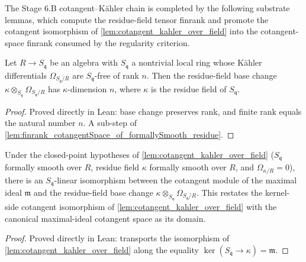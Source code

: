 The Stage 6.B cotangent--K\"ahler chain is completed by the
following substrate lemmas, which compute the residue-field tensor finrank and
promote the cotangent isomorphism of \cref{lem:cotangent_kahler_over_field} into
the cotangent-space finrank consumed by the regularity criterion.

\begin{lemma}
  \label{lem:finrank_residue_kaehler_of_free_rank}
  Let \(R \to S_{\mathfrak q}\) be an algebra with \(S_{\mathfrak q}\) a nontrivial
  local ring whose K\"ahler differentials \(\Omega_{S_{\mathfrak q}/R}\) are
  \(S_{\mathfrak q}\)-free of rank \(n\). Then the residue-field base change
  \(\kappa \otimes_{S_{\mathfrak q}} \Omega_{S_{\mathfrak q}/R}\) has
  \(\kappa\)-dimension \(n\), where \(\kappa\) is the residue field of \(S_{\mathfrak q}\).
\end{lemma}

\begin{proof}
  Proved directly in Lean: base change preserves rank, and finite rank equals the
  natural number \(n\). A sub-step of
  \cref{lem:finrank_cotangentSpace_of_formallySmooth_residue}.
\end{proof}


\begin{lemma}
  \label{lem:cotangent_iso_maximalIdeal_residue_kaehler}
  Under the closed-point hypotheses of \cref{lem:cotangent_kahler_over_field}
  (\(S_{\mathfrak q}\) formally smooth over \(R\), residue field \(\kappa\) formally
  smooth over \(R\), and \(\Omega_{\kappa/R} = 0\)), there is an
  \(S_{\mathfrak q}\)-linear isomorphism between the cotangent module of the maximal
  ideal \(\mathfrak m\) and the residue-field base change
  \(\kappa \otimes_{S_{\mathfrak q}} \Omega_{S_{\mathfrak q}/R}\). This restates the
  kernel-side cotangent isomorphism of \cref{lem:cotangent_kahler_over_field} with the
  canonical maximal-ideal cotangent space as its domain.
\end{lemma}

\begin{proof}
  Proved directly in Lean: transports the isomorphism of
  \cref{lem:cotangent_kahler_over_field} along the equality
  \(\ker(S_{\mathfrak q} \to \kappa) = \mathfrak m\).
\end{proof}

